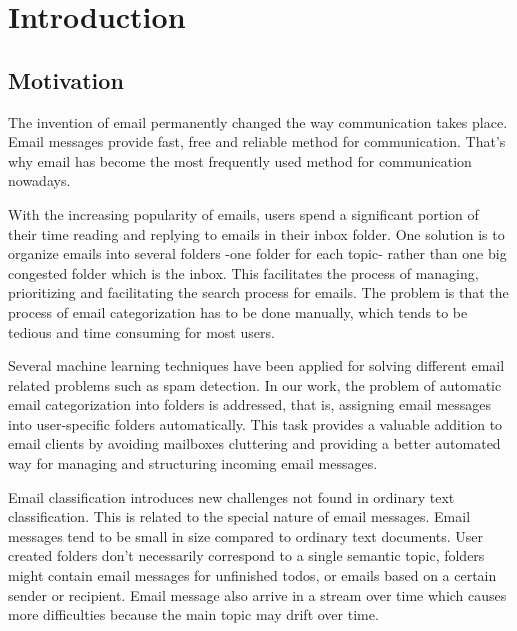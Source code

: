 
\chapter{Introduction} %

\label{Chapter1} %


\section{Motivation}

The invention of email permanently changed the way communication takes place. 
Email messages provide fast, free and reliable method for communication. 
That's why email has become the most frequently used method for communication 
nowadays.

With the increasing popularity of emails, users spend a significant portion of 
their time reading and replying to emails in their inbox folder. One solution 
is to organize emails into several folders -one folder for each topic- rather 
than one big congested folder which is the inbox. This facilitates the process 
of managing, prioritizing and facilitating the search process for emails. 
The problem is that the process of email categorization has to be done manually, 
which tends to be tedious and time consuming for most users.

Several machine learning techniques have been applied for solving different 
email related problems such as spam detection. In our work, the problem of 
automatic email categorization into folders is addressed, that is, assigning 
email messages into user-specific folders automatically. This task provides 
a valuable addition to email clients by avoiding mailboxes cluttering and 
providing a better automated way for managing and structuring incoming email 
messages.

Email classification introduces new challenges not found in ordinary text 
classification. This is related to the special nature of email messages. Email 
messages tend to be small in size compared to ordinary text documents. User 
created folders don't necessarily correspond to a single semantic topic, 
folders might contain email messages for unfinished todos, or emails based on 
a certain sender or recipient. Email message also arrive in a stream over time 
which causes more difficulties because the main topic may drift over time.

